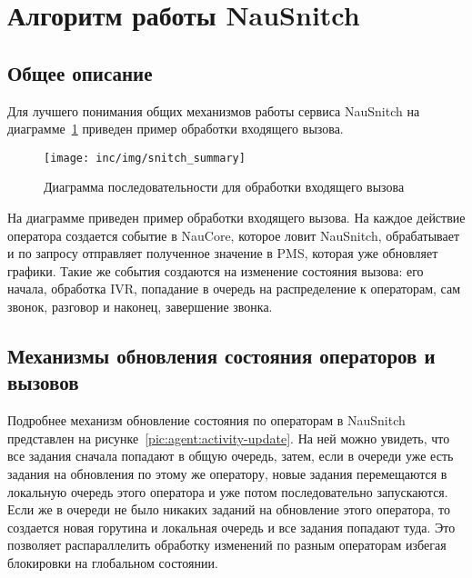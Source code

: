 \section{Алгоритм работы NauSnitch}

\subsection{Общее описание}

Для лучшего понимания общих механизмов работы сервиса NauSnitch
на диаграмме~\ref{pic:uml-seq-summary} приведен пример обработки входящего вызова.

\begin{figure}[ht]
    \centering
    \texttt{[image: inc/img/snitch\_summary]}
    \caption{Диаграмма последовательности для обработки входящего вызова}
    \label{pic:uml-seq-summary}
\end{figure}

На диаграмме приведен пример обработки входящего вызова.
На каждое действие оператора создается событие в NauCore, которое ловит NauSnitch,
обрабатывает и по запросу отправляет полученное значение в PMS,
которая уже обновляет графики.
Такие же события создаются на изменение состояния вызова: его начала, обработка IVR,
попадание в очередь на распределение к операторам, сам звонок, разговор и наконец, завершение звонка.

\subsection{Механизмы обновления состояния операторов и вызовов}\label{subsec:механизмы-обновления-состояния-операторов-и-вызовов}

Подробнее механизм обновление состояния по операторам в NauSnitch представлен на рисунке~\ref{pic:agent:activity-update}.
На ней можно увидеть, что все задания сначала попадают в общую очередь,
затем, если в очереди уже есть задания на обновления по этому же оператору,
новые задания перемещаются в локальную очередь этого оператора и уже потом последовательно запускаются.
Если же в очереди не было никаких заданий на обновление этого оператора,
то создается новая горутина и локальная очередь и все задания попадают туда.
Это позволяет распараллелить обработку изменений по разным операторам
избегая блокировки на глобальном состоянии.

